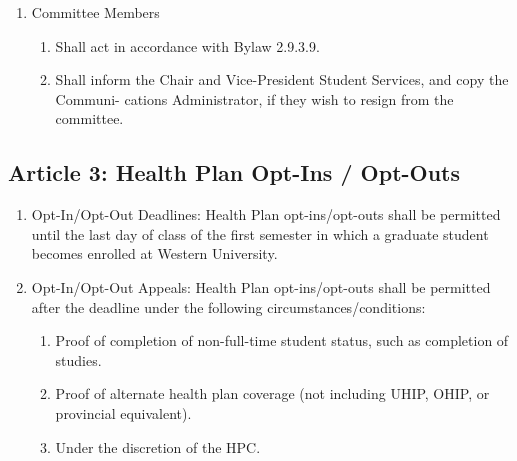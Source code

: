 \begin{enumerate} [label*=\arabic*., align=left]
\begin{enumerate} [label*=\arabic*., align=left]
\begin{enumerate}
\item If for whatever reason, the Chair is unavailable temporarily, the Deputy Chair will fulfil the roles and responsibilities as delegated by the Chair until the Chair returns.
\item The only circumstances in which the HPC may be temporarily chaired by the Official Liaison is for the purpose of conducting an election to select an existing member of the HPC to the position of Chair even if for a temporary, non-permanent and short-term basis, or until the Chair position is filled.
\end{enumerate}
\item Committee Members
\begin{enumerate}
\item Shall act in accordance with Bylaw 2.9.3.9.
\item Shall inform the Chair and Vice-President Student Services, and copy the
Communi- cations Administrator, if they wish to resign from the committee.
\end{enumerate}
\end{enumerate}
\end{enumerate}

\subsection{Article 3: Health Plan Opt-Ins / Opt-Outs}
\begin{enumerate}[label*=\arabic*., align=left]	
\item Opt-In/Opt-Out Deadlines: Health Plan opt-ins/opt-outs shall be permitted until the last day of class of the first semester in which a graduate student becomes enrolled at Western University.
\item Opt-In/Opt-Out Appeals: Health Plan opt-ins/opt-outs shall be permitted after the deadline under the following circumstances/conditions:
\begin{enumerate}[label*=\arabic*., align=left]
\item Proof of completion of non-full-time student status, such as completion of studies.
\item Proof of alternate health plan coverage (not including UHIP, OHIP, or provincial equivalent).
\item Under the discretion of the HPC.
\end{enumerate}
\end{enumerate} 

